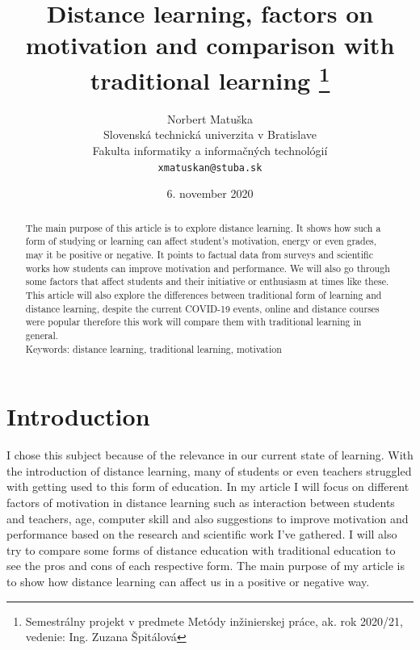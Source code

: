 \documentclass[10pt,twoside,english,a4paper]{article}
\title{Distance learning, factors on motivation and comparison with
traditional learning \thanks{Semestrálny projekt v predmete Metódy inžinierskej práce, ak. rok 2020/21, vedenie: Ing. Zuzana Špitálová}}
\author{Norbert Matuška\\[2pt]
	{\small Slovenská technická univerzita v Bratislave}\\
	{\small Fakulta informatiky a informačných technológií}\\
	{\small \texttt{xmatuskan@stuba.sk}}
	}
\date{\small 6. november 2020}
\begin{document}
\maketitle

\begin{abstract}
The main purpose of this article is to explore distance learning. It shows how such a form of studying or learning can affect student's motivation, energy or even grades, may it be positive or negative. It points to factual data from surveys and scientific works how students can improve motivation and performance. We will also go through some factors that affect students and their initiative or enthusiasm at times like these. This article will also explore the differences between traditional form of learning and distance learning, despite the current COVID-19 events, online and distance courses were popular therefore this work will compare them with traditional learning in general.\\
Keywords: distance learning, traditional learning, motivation
\end{abstract}

\newpage
\tableofcontents %
\newpage
\section{Introduction}

I chose this subject because of the relevance in our current state of learning. With the introduction of distance learning, many of students or even teachers struggled with getting used to this form of education. In my article I will focus on different factors of motivation in distance learning such as interaction between students and teachers, age, computer skill and also suggestions to improve motivation and performance based on the research and scientific work I've gathered. I will also try to compare some forms of distance education with traditional education to see the pros and cons of each respective form. The main purpose of my article is to show how distance learning can affect us in a positive or negative way.
\end{document}
